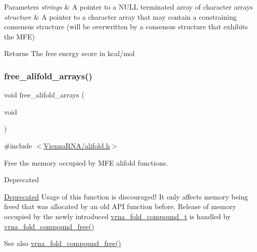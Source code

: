 \begin{DoxyParams}{Parameters}
{\em strings} & A pointer to a N\+U\+LL terminated array of character arrays \\
\hline
{\em structure} & A pointer to a character array that may contain a constraining consensus structure (will be overwritten by a consensus structure that exhibits the M\+FE) \\
\hline
\end{DoxyParams}
\begin{DoxyReturn}{Returns}
The free energy score in kcal/mol 
\end{DoxyReturn}
\mbox{\label{group__mfe__global__deprecated_ga72095e4554b5d577250ea14c42acc49e}} 
\subsubsection{\texorpdfstring{free\+\_\+alifold\+\_\+arrays()}{free\_alifold\_arrays()}}
{\footnotesize\ttfamily void free\+\_\+alifold\+\_\+arrays (\begin{DoxyParamCaption}\item[{void}]{ }\end{DoxyParamCaption})}



{\ttfamily \#include $<$\hyperlink{alifold_8h}{Vienna\+R\+N\+A/alifold.\+h}$>$}



Free the memory occupied by M\+FE alifold functions. 

\begin{DoxyRefDesc}{Deprecated}
\item[\hyperlink{deprecated__deprecated000014}{Deprecated}]Usage of this function is discouraged! It only affects memory being free\textquotesingle{}d that was allocated by an old A\+PI function before. Release of memory occupied by the newly introduced \hyperlink{group__fold__compound_ga1b0cef17fd40466cef5968eaeeff6166}{vrna\+\_\+fold\+\_\+compound\+\_\+t} is handled by \hyperlink{group__fold__compound_ga576a077b418a9c3650e06f8e5d296fc2}{vrna\+\_\+fold\+\_\+compound\+\_\+free()}\end{DoxyRefDesc}


\begin{DoxySeeAlso}{See also}
\hyperlink{group__fold__compound_ga576a077b418a9c3650e06f8e5d296fc2}{vrna\+\_\+fold\+\_\+compound\+\_\+free()} 
\end{DoxySeeAlso}
